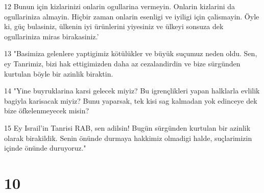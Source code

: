 \par 12 Bunun için kizlarinizi onlarin ogullarina vermeyin. Onlarin kizlarini da ogullariniza almayin. Hiçbir zaman onlarin esenligi ve iyiligi için çalismayin. Öyle ki, güç bulasiniz, ülkenin iyi ürünlerini yiyesiniz ve ülkeyi sonsuza dek ogullariniza miras birakasiniz.'
\par 13 "Basimiza gelenlere yaptigimiz kötülükler ve büyük suçumuz neden oldu. Sen, ey Tanrimiz, bizi hak ettigimizden daha az cezalandirdin ve bize sürgünden kurtulan böyle bir azinlik biraktin.
\par 14 "Yine buyruklarina karsi gelecek miyiz? Bu igrençlikleri yapan halklarla evlilik bagiyla karisacak miyiz? Bunu yaparsak, tek kisi sag kalmadan yok edinceye dek bize öfkelenmeyecek misin?
\par 15 Ey Israil'in Tanrisi RAB, sen adilsin! Bugün sürgünden kurtulan bir azinlik olarak birakildik. Senin önünde durmaya hakkimiz olmadigi halde, suçlarimizin içinde önünde duruyoruz."

\chapter{10}

